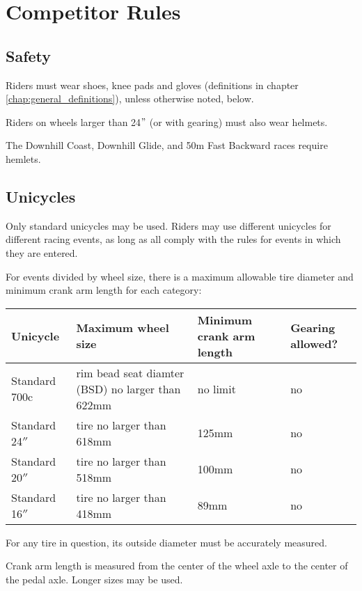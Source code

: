 \chapter{Competitor Rules}

\section{Safety}

Riders must wear shoes, knee pads and gloves (definitions in chapter \ref{chap:general_definitions}), unless otherwise noted, below.

Riders on wheels larger than 24$"$ (or with gearing) must also wear helmets.

The Downhill Coast, Downhill Glide, and 50m Fast Backward races require hemlets.

\section{Unicycles}

Only standard unicycles may be used.
Riders may use different unicycles for different racing events, as long as all comply with the rules for events in which they are entered.

For events divided by wheel size, there is a maximum allowable tire diameter and minimum crank arm length for each category:

\begin{longtable}{|p{3cm}|p{5cm}|p{2cm}|p{2cm}|}
\hline
\textbf{Unicycle} & \textbf{Maximum wheel size} & \textbf{Minimum crank arm length} & \textbf{Gearing allowed?}\\
\hline
Standard 700c & rim bead seat diamter (BSD) 
no larger than 622mm & no limit & no \\
\hline
Standard 24$''$ & tire no larger than 618mm & 125mm & no \\
\hline
Standard 20$''$ & tire no larger than 518mm & 100mm & no \\
\hline
Standard 16$''$ & tire no larger than 418mm & 89mm & no \\
\hline
\end{longtable}

For any tire in question, its outside diameter must be accurately measured.

Crank arm length is measured from the center of the wheel axle to the center of the pedal axle. Longer sizes may be used.

